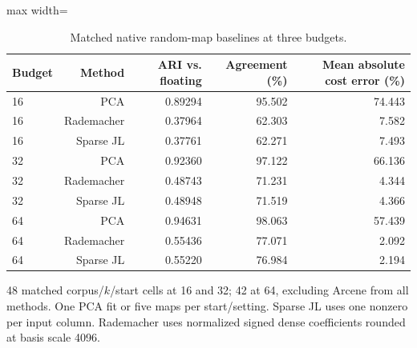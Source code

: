 \begin{table}[tp]
\caption{Matched native random-map baselines at three budgets.}\label{tab:random-controls}
\centering\small
\begin{adjustbox}{max width=\textwidth}
\begin{tabular}{@{}lrrrr@{}}
\toprule
Budget & Method & ARI vs. floating & Agreement (\%) & Mean absolute cost error (\%) \\
\midrule
16 & PCA & 0.89294 & 95.502 & 74.443 \\
16 & Rademacher & 0.37964 & 62.303 & 7.582 \\
16 & Sparse JL & 0.37761 & 62.271 & 7.493 \\
32 & PCA & 0.92360 & 97.122 & 66.136 \\
32 & Rademacher & 0.48743 & 71.231 & 4.344 \\
32 & Sparse JL & 0.48948 & 71.519 & 4.366 \\
64 & PCA & 0.94631 & 98.063 & 57.439 \\
64 & Rademacher & 0.55436 & 77.071 & 2.092 \\
64 & Sparse JL & 0.55220 & 76.984 & 2.194 \\
\bottomrule
\end{tabular}
\end{adjustbox}
\par\vspace{3pt}\begin{minipage}{0.98\textwidth}\footnotesize 48 matched corpus/$k$/start cells at 16 and 32; 42 at 64, excluding Arcene from all methods. One PCA fit or five maps per start/setting. Sparse JL uses one nonzero per input column. Rademacher uses normalized signed dense coefficients rounded at basis scale 4096.\end{minipage}
\end{table}
